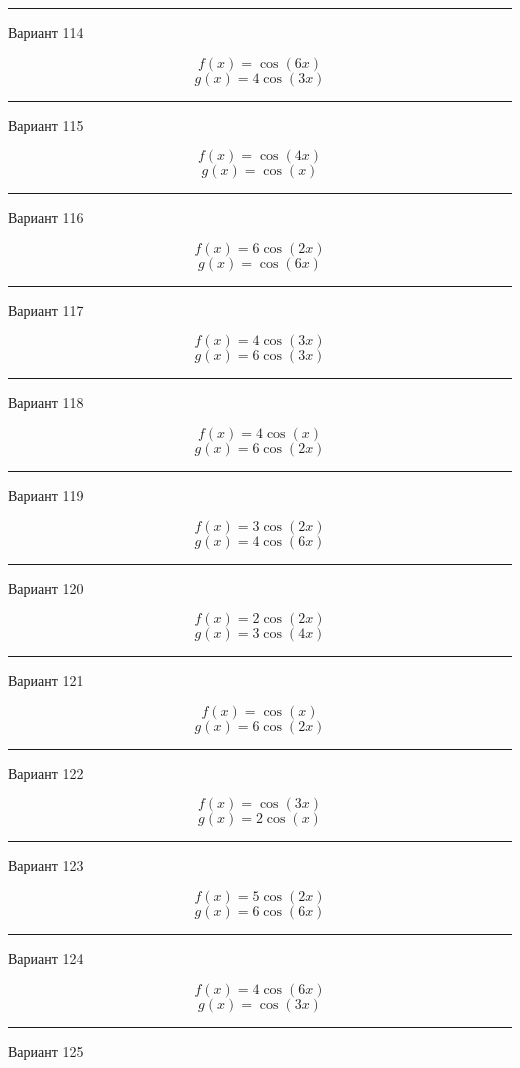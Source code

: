 \documentclass[11pt]{report}
\begin{document}
\rule{\textwidth}{.2mm}

Вариант 114

$$f(x)=\cos{\left(6 x \right)}$$
$$g(x)=4 \cos{\left(3 x \right)}$$

\rule{\textwidth}{.2mm}

Вариант 115

$$f(x)=\cos{\left(4 x \right)}$$
$$g(x)=\cos{\left(x \right)}$$

\rule{\textwidth}{.2mm}

Вариант 116

$$f(x)=6 \cos{\left(2 x \right)}$$
$$g(x)=\cos{\left(6 x \right)}$$

\rule{\textwidth}{.2mm}

Вариант 117

$$f(x)=4 \cos{\left(3 x \right)}$$
$$g(x)=6 \cos{\left(3 x \right)}$$

\rule{\textwidth}{.2mm}

Вариант 118

$$f(x)=4 \cos{\left(x \right)}$$
$$g(x)=6 \cos{\left(2 x \right)}$$

\rule{\textwidth}{.2mm}

Вариант 119

$$f(x)=3 \cos{\left(2 x \right)}$$
$$g(x)=4 \cos{\left(6 x \right)}$$

\rule{\textwidth}{.2mm}

Вариант 120

$$f(x)=2 \cos{\left(2 x \right)}$$
$$g(x)=3 \cos{\left(4 x \right)}$$

\rule{\textwidth}{.2mm}

Вариант 121

$$f(x)=\cos{\left(x \right)}$$
$$g(x)=6 \cos{\left(2 x \right)}$$

\rule{\textwidth}{.2mm}

Вариант 122

$$f(x)=\cos{\left(3 x \right)}$$
$$g(x)=2 \cos{\left(x \right)}$$

\rule{\textwidth}{.2mm}

Вариант 123

$$f(x)=5 \cos{\left(2 x \right)}$$
$$g(x)=6 \cos{\left(6 x \right)}$$

\rule{\textwidth}{.2mm}

Вариант 124

$$f(x)=4 \cos{\left(6 x \right)}$$
$$g(x)=\cos{\left(3 x \right)}$$

\rule{\textwidth}{.2mm}

Вариант 125
\end{document}
